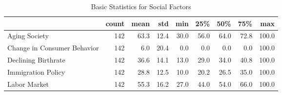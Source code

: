 \documentclass[a4paper,12pt]{article}
\begin{document}
        
        \begin{landscape}
        \begin{table}
\caption{Basic Statistics for Social Factors}
\label{tab:statistics_Social_Factors}
\begin{tabular}{lrrrrrrrr}
\toprule
 & count & mean & std & min & 25\% & 50\% & 75\% & max \\
\midrule
Aging Society & 142 & 63.3 & 12.4 & 30.0 & 56.0 & 64.0 & 72.8 & 100.0 \\
Change in Consumer Behavior & 142 & 6.0 & 20.4 & 0.0 & 0.0 & 0.0 & 0.0 & 100.0 \\
Declining Birthrate & 142 & 36.6 & 14.1 & 13.0 & 29.0 & 34.0 & 40.8 & 100.0 \\
Immigration Policy & 142 & 28.8 & 12.5 & 10.0 & 20.2 & 26.5 & 35.0 & 100.0 \\
Labor Market & 142 & 55.3 & 16.2 & 27.0 & 44.0 & 54.0 & 66.0 & 100.0 \\
\bottomrule
\end{tabular}
\end{table}

        \end{landscape}
        
        
\end{document}
